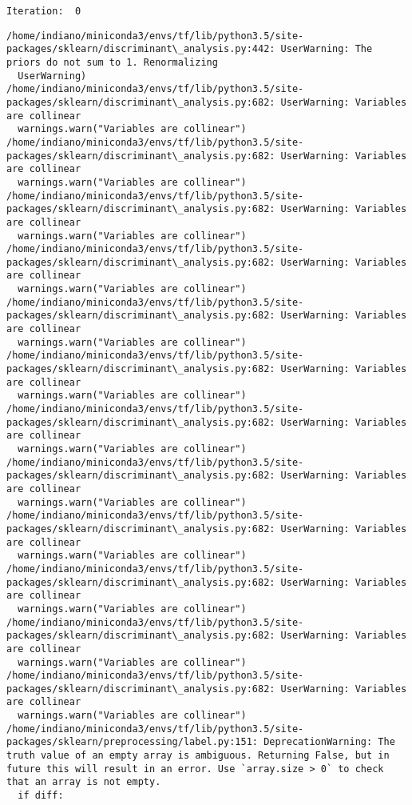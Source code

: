\documentclass[11pt]{article}
\begin{document}
    \begin{Verbatim}[commandchars=\\\{\}]
Iteration:  0

    \end{Verbatim}

    \begin{Verbatim}[commandchars=\\\{\}]
/home/indiano/miniconda3/envs/tf/lib/python3.5/site-packages/sklearn/discriminant\_analysis.py:442: UserWarning: The priors do not sum to 1. Renormalizing
  UserWarning)
/home/indiano/miniconda3/envs/tf/lib/python3.5/site-packages/sklearn/discriminant\_analysis.py:682: UserWarning: Variables are collinear
  warnings.warn("Variables are collinear")
/home/indiano/miniconda3/envs/tf/lib/python3.5/site-packages/sklearn/discriminant\_analysis.py:682: UserWarning: Variables are collinear
  warnings.warn("Variables are collinear")
/home/indiano/miniconda3/envs/tf/lib/python3.5/site-packages/sklearn/discriminant\_analysis.py:682: UserWarning: Variables are collinear
  warnings.warn("Variables are collinear")
/home/indiano/miniconda3/envs/tf/lib/python3.5/site-packages/sklearn/discriminant\_analysis.py:682: UserWarning: Variables are collinear
  warnings.warn("Variables are collinear")
/home/indiano/miniconda3/envs/tf/lib/python3.5/site-packages/sklearn/discriminant\_analysis.py:682: UserWarning: Variables are collinear
  warnings.warn("Variables are collinear")
/home/indiano/miniconda3/envs/tf/lib/python3.5/site-packages/sklearn/discriminant\_analysis.py:682: UserWarning: Variables are collinear
  warnings.warn("Variables are collinear")
/home/indiano/miniconda3/envs/tf/lib/python3.5/site-packages/sklearn/discriminant\_analysis.py:682: UserWarning: Variables are collinear
  warnings.warn("Variables are collinear")
/home/indiano/miniconda3/envs/tf/lib/python3.5/site-packages/sklearn/discriminant\_analysis.py:682: UserWarning: Variables are collinear
  warnings.warn("Variables are collinear")
/home/indiano/miniconda3/envs/tf/lib/python3.5/site-packages/sklearn/discriminant\_analysis.py:682: UserWarning: Variables are collinear
  warnings.warn("Variables are collinear")
/home/indiano/miniconda3/envs/tf/lib/python3.5/site-packages/sklearn/discriminant\_analysis.py:682: UserWarning: Variables are collinear
  warnings.warn("Variables are collinear")
/home/indiano/miniconda3/envs/tf/lib/python3.5/site-packages/sklearn/discriminant\_analysis.py:682: UserWarning: Variables are collinear
  warnings.warn("Variables are collinear")
/home/indiano/miniconda3/envs/tf/lib/python3.5/site-packages/sklearn/discriminant\_analysis.py:682: UserWarning: Variables are collinear
  warnings.warn("Variables are collinear")
/home/indiano/miniconda3/envs/tf/lib/python3.5/site-packages/sklearn/preprocessing/label.py:151: DeprecationWarning: The truth value of an empty array is ambiguous. Returning False, but in future this will result in an error. Use `array.size > 0` to check that an array is not empty.
  if diff:

    \end{Verbatim}
\end{document}
